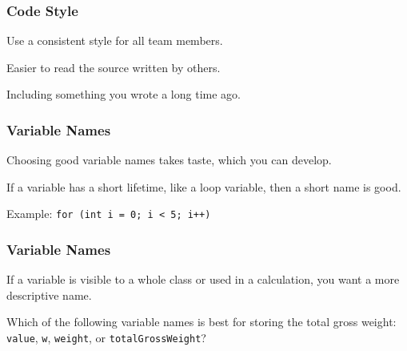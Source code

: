 \begin{frame}
\frametitle{Code Style}
\begin{changemargin}{1cm}

Use a consistent style for all team members.

Easier to read the source written by others.

Including something you wrote a long time ago.

\end{changemargin}
\end{frame}

\begin{frame}
\frametitle{Variable Names}
\begin{changemargin}{1cm}

Choosing good variable names takes taste, which you can develop.

If a variable has a short lifetime, like a loop variable, then a short name
is good.

Example: {\tt for (int i = 0; i < 5; i++)}

\end{changemargin}
\end{frame}

\begin{frame}
\frametitle{Variable Names}
\begin{changemargin}{1cm}

If a variable is visible to a whole class or used in a calculation, you want a more descriptive name.

Which of the following variable names is best for storing the total gross weight: \texttt{value}, \texttt{w}, \texttt{weight}, or \texttt{totalGrossWeight}? 

\end{changemargin}
\end{frame}

